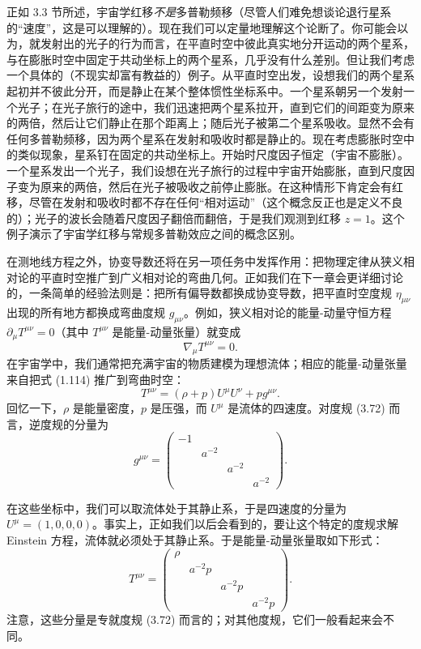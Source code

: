 正如 3.3 节所述，宇宙学红移\emph{不是}多普勒频移（尽管人们难免想谈论退行星系的“速度”，这是可以理解的）。现在我们可以定量地理解这个论断了。你可能会以为，就发射出的光子的行为而言，在平直时空中彼此真实地分开运动的两个星系，与在膨胀时空中固定于共动坐标上的两个星系，几乎没有什么差别。但让我们考虑一个具体的（不现实却富有教益的）例子。从平直时空出发，设想我们的两个星系起初并不彼此分开，而是静止在某个整体惯性坐标系中。一个星系朝另一个发射一个光子；在光子旅行的途中，我们迅速把两个星系拉开，直到它们的间距变为原来的两倍，然后让它们静止在那个距离上；随后光子被第二个星系吸收。显然不会有任何多普勒频移，因为两个星系在发射和吸收时都是静止的。现在考虑膨胀时空中的类似现象，星系钉在固定的共动坐标上。开始时尺度因子恒定（宇宙不膨胀）。一个星系发出一个光子，我们设想在光子旅行的过程中宇宙开始膨胀，直到尺度因子变为原来的两倍，然后在光子被吸收之前停止膨胀。在这种情形下肯定会有红移，尽管在发射和吸收时都不存在任何“相对运动”（这个概念反正也是定义不良的）；光子的波长会随着尺度因子翻倍而翻倍，于是我们观测到红移 $z = 1$。这个例子演示了宇宙学红移与常规多普勒效应之间的概念区别。

在测地线方程之外，协变导数还将在另一项任务中发挥作用：把物理定律从狭义相对论的平直时空推广到广义相对论的弯曲几何。正如我们在下一章会更详细讨论的，一条简单的经验法则是：把所有偏导数都换成协变导数，把平直时空度规 $\eta_{\mu\nu}$ 出现的所有地方都换成弯曲度规 $g_{\mu\nu}$。例如，狭义相对论的能量-动量守恒方程 $\partial_\mu T^{\mu\nu} = 0$（其中 $T^{\mu\nu}$ 是能量-动量张量）就变成
\begin{equation*}
\nabla_\mu T^{\mu\nu} = 0.
\tag{3.92}
\end{equation*}
在宇宙学中，我们通常把充满宇宙的物质建模为理想流体；相应的能量-动量张量来自把式 (1.114) 推广到弯曲时空：
\begin{equation*}
T^{\mu\nu} = (\rho + p)U^\mu U^\nu + pg^{\mu\nu}.
\tag{3.93}
\end{equation*}
回忆一下，$\rho$ 是能量密度，$p$ 是压强，而 $U^\mu$ 是流体的四速度。对度规 (3.72) 而言，逆度规的分量为
\begin{equation*}
g^{\mu\nu} = \begin{pmatrix} -1 & & & \\ & a^{-2} & & \\ & & a^{-2} & \\ & & & a^{-2} \end{pmatrix}.
\tag{3.94}
\end{equation*}

在这些坐标中，我们可以取流体处于其静止系，于是四速度的分量为 $U^\mu = (1, 0, 0, 0)$。事实上，正如我们以后会看到的，要让这个特定的度规求解 Einstein 方程，流体就必须处于其静止系。于是能量-动量张量取如下形式：
\begin{equation*}
T^{\mu\nu} = \begin{pmatrix} \rho & & & \\ & a^{-2}p & & \\ & & a^{-2}p & \\ & & & a^{-2}p \end{pmatrix}.
\tag{3.95}
\end{equation*}
注意，这些分量是专就度规 (3.72) 而言的；对其他度规，它们一般看起来会不同。

